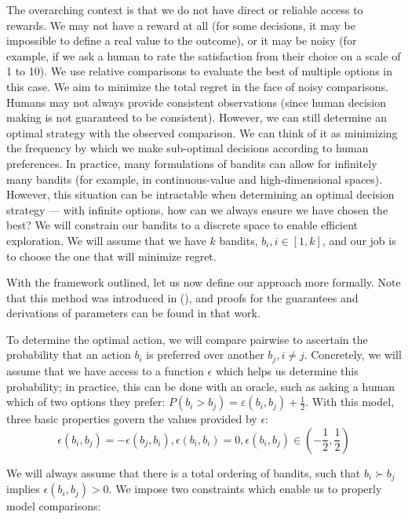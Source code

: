 \documentclass[
  letterpaper,
  DIV=11,
  numbers=noendperiod,
  oneside]{scrreprt}
\theoremstyle{remark}
\begin{document}
The overarching context is that we do not have direct or reliable access
to rewards. We may not have a reward at all (for some decisions, it may
be impossible to define a real value to the outcome), or it may be noisy
(for example, if we ask a human to rate the satisfaction from their
choice on a scale of 1 to 10). We use relative comparisons to evaluate
the best of multiple options in this case. We aim to minimize the total
regret in the face of noisy comparisons. Humans may not always provide
consistent observations (since human decision making is not guaranteed
to be consistent). However, we can still determine an optimal strategy
with the observed comparison. We can think of it as minimizing the
frequency by which we make sub-optimal decisions according to human
preferences. In practice, many formulations of bandits can allow for
infinitely many bandits (for example, in continuous-value and
high-dimensional spaces). However, this situation can be intractable
when determining an optimal decision strategy --- with infinite options,
how can we always ensure we have chosen the best? We will constrain our
bandits to a discrete space to enable efficient exploration. We will
assume that we have \(k\) bandits, \(b_i, i \in [1, k]\), and our job is
to choose the one that will minimize regret.

With the framework outlined, let us now define our approach more
formally. Note that this method was introduced in
(), and proofs for the
guarantees and derivations of parameters can be found in that work.

To determine the optimal action, we will compare pairwise to ascertain
the probability that an action \(b_i\) is preferred over another
\(b_j, i \ne j\). Concretely, we will assume that we have access to a
function \(\epsilon\) which helps us determine this probability; in
practice, this can be done with an oracle, such as asking a human which
of two options they prefer:
\(P(b_i > b_j) = \varepsilon(b_i, b_j) + \frac{1}{2}\). With this model,
three basic properties govern the values provided by \(\epsilon\):
\[\epsilon(b_i, b_j) = -\epsilon(b_j, b_i), \epsilon(b_i, b_i) = 0, \epsilon(b_i, b_j) \in \left(-\frac{1}{2}, \frac{1}{2} \right)\]

We will always assume that there is a total ordering of bandits, such
that \(b_i \succ b_j\) implies \(\epsilon(b_i, b_j) > 0\). We impose two
constraints which enable us to properly model comparisons:
\end{document}
